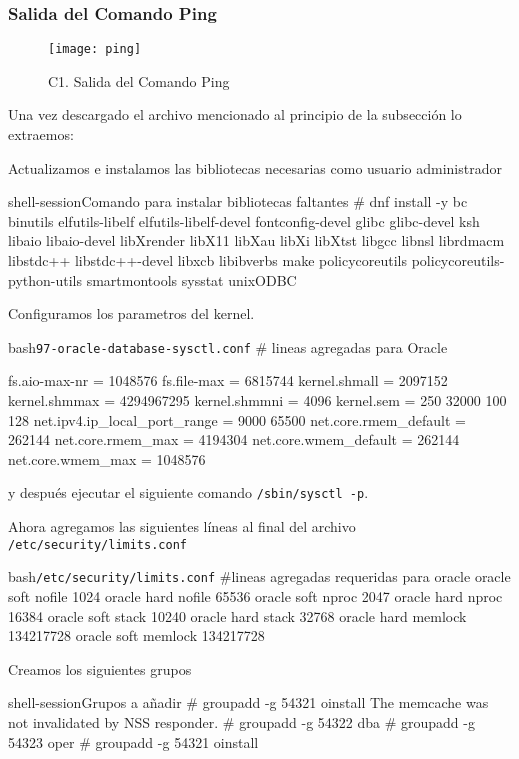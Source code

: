 \documentclass[./main.tex]{subfiles}
\begin{document}
\subsubsection{Salida del Comando Ping}\label{sec:salida-del-comando}
\begin{figure}[H]
  \centering
  \texttt{[image: ping]}
  \caption{C1. Salida del Comando Ping}\label{fig:ping}
\end{figure}

Una vez descargado el archivo mencionado al principio de la subsección lo extraemos:
Actualizamos e instalamos las bibliotecas necesarias como usuario administrador%
\begin{codeC}{shell-session}{Comando para instalar bibliotecas faltantes}
# dnf install -y bc binutils elfutils-libelf elfutils-libelf-devel fontconfig-devel glibc glibc-devel ksh libaio libaio-devel libXrender libX11 libXau libXi libXtst libgcc libnsl librdmacm libstdc++ libstdc++-devel libxcb libibverbs make policycoreutils policycoreutils-python-utils smartmontools sysstat unixODBC
\end{codeC}

Configuramos los parametros del kernel.
\begin{codeC}{bash}{\texttt{97-oracle-database-sysctl.conf}}
# lineas agregadas para Oracle

fs.aio-max-nr = 1048576
fs.file-max = 6815744
kernel.shmall = 2097152
kernel.shmmax = 4294967295
kernel.shmmni = 4096
kernel.sem = 250 32000 100 128
net.ipv4.ip_local_port_range = 9000 65500
net.core.rmem_default = 262144
net.core.rmem_max = 4194304
net.core.wmem_default = 262144
net.core.wmem_max = 1048576
\end{codeC}

y después ejecutar el siguiente comando \texttt{/sbin/sysctl -p}.

Ahora agregamos las siguientes líneas al final del archivo \texttt{/etc/security/limits.conf}
\begin{codeC}{bash}{\texttt{/etc/security/limits.conf}}
#lineas agregadas requeridas para oracle
oracle soft nofile 1024
oracle hard nofile 65536
oracle soft nproc 2047
oracle hard nproc 16384
oracle soft stack 10240
oracle hard stack 32768
oracle hard memlock 134217728
oracle soft memlock 134217728
\end{codeC}
\newpage{}
Creamos los siguientes grupos
\begin{codeC}{shell-session}{Grupos a añadir}
# groupadd -g 54321 oinstall
The memcache was not invalidated by NSS responder.
# groupadd -g 54322 dba
# groupadd -g 54323 oper
# groupadd -g 54321 oinstall
\end{codeC}
\end{document}
